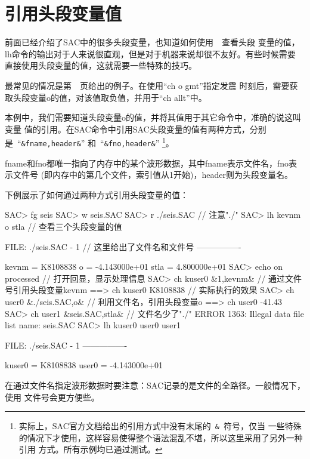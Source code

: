 \section{引用头段变量值}
前面已经介绍了SAC中的很多头段变量，也知道如何使用~~查看头段
变量的值，lh命令的输出对于人来说很直观，但是对于机器来说却很不友好。有些时候需要
直接使用头段变量的值，这就需要一些特殊的技巧。

最常见的情况是第~\pageref{code:origin-time}~页给出的例子。在使用``ch o gmt''指定发震
时刻后，需要获取头段变量o的值，对该值取负值，并用于``ch allt''中。

本例中，我们需要知道头段变量o的值，并将其值用于其它命令中，准确的说这叫变量
值的引用。在SAC命令中引用SAC头段变量的值有两种方式，分别是~``\verb+&fname,header&+''
和~``\verb+&fno,header&+''
\footnote{实际上，SAC官方文档给出的引用方式中没有末尾的~\verb+&+~符号，仅当
一些特殊的情况下才使用，这样容易使得整个语法混乱不堪，所以这里采用了另外一种引用
方式。所有示例均已通过测试。}。

fname和fno都唯一指向了内存中的某个波形数据，其中fname表示文件名，fno表示文件号
(即内存中的第几个文件，索引值从1开始)，header则为头段变量名。

下例展示了如何通过两种方式引用头段变量的值：
\begin{SACCode}
SAC> fg seis
SAC> w seis.SAC
SAC> r ./seis.SAC               // 注意"./"
SAC> lh kevnm o stla            // 查看三个头段变量的值

  FILE: ./seis.SAC - 1          // 这里给出了文件名和文件号
 ----------------

     kevnm = K8108838
         o = -4.143000e+01
      stla = 4.800000e+01
SAC> echo on processed          // 打开回显，显示处理信息
SAC> ch kuser0 &1,kevnm&        // 通过文件号引用头段变量kevnm
 ==>  ch kuser0 K8108838        // 实际执行的效果
SAC> ch user0 &./seis.SAC,o&    // 利用文件名，引用头段变量o
 ==>  ch user0 -41.43
SAC> ch user1 &seis.SAC,stla&   // 文件名少了"./"
 ERROR 1363: Illegal data file list name: seis.SAC
SAC> lh kuser0 user0 user1

  FILE: ./seis.SAC - 1
   ----------------

     kuser0 = K8108838
     user0 = -4.143000e+01
\end{SACCode}

在通过文件名指定波形数据时要注意：SAC记录的是文件的全路径。一般情况下，使用
文件号会更方便些。
